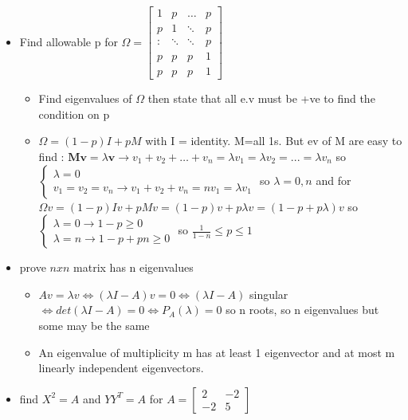 \documentclass[10pt,landscape,a4paper]{article}
\begin{document}
\begin{multicols*}{4}
\begin{spacing}{0.1}
\begin{itemize}
\item \colorbox{green!10}{ Find allowable p for $ \Omega = \begin{bmatrix}
1& p & \ldots & p \\ 
p & 1 & \ddots & p  \\ 
\colon & \ddots  & \ddots  & p  \\ 
p& p & p & 1 \\ p& p & p & 1
\end{bmatrix} $ }

\begin{itemize}
\item Find eigenvalues of $\Omega$ then state that all e.v must be +ve to find the condition on p
\item $\Omega = (1-p) I + p M$ with I = identity. M=all 1s. But ev of M  are easy to find : $\textbf{Mv}=\lambda \textbf{v} \rightarrow v_1+v_2+ \ldots + v_n = \lambda v_1 = \lambda v_2 = ... = \lambda v_n  $ so $\begin{cases} \lambda =0 \\ v_1=v_2=v_n \rightarrow v_1+v_2 +v_n=nv_1=\lambda v_1 \end{cases}$ so $\lambda=0,n$ and for $\Omega v=(1-p)Iv+pMv=(1-p)v+p\lambda v = (1-p+p\lambda)v$ so $\begin{cases} \lambda =0 \rightarrow 1-p \ge 0 \\ \lambda =n \rightarrow 1-p+pn \ge 0 \end{cases}$ so $ \frac{1}{1-n} \le p \le 1$

\end{itemize}

\item \colorbox{green!10}{ prove $nxn$ matrix has n eigenvalues } 
\begin{itemize}
	
	\item $Av =  \lambda v \Leftrightarrow (\lambda I -A)v=0 \Leftrightarrow (\lambda I -A) $ singular $\Leftrightarrow det (\lambda I - A) =0 \Leftrightarrow P_A(\lambda)=0$ so n roots, so n eigenvalues but some may be the same
	
	\item An eigenvalue of multiplicity m has at least 1 eigenvector and at most m linearly independent eigenvectors.

\end{itemize}

\item \colorbox{green!10}{ find $X^2=A$ and $YY^T=A$ for $A=\begin{bmatrix} 2 & -2 \\ -2 & 5 \end{bmatrix}$ } 


\end{itemize}
\end{spacing}
\end{multicols*}
\end{document}
